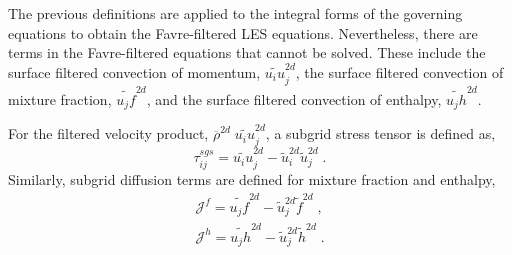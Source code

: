 The previous definitions are applied to the integral forms of the governing equations to obtain the Favre-filtered LES equations.  Nevertheless, there are terms in the Favre-filtered equations that cannot be solved.  These include the surface filtered convection of momentum, $\widetilde{u_i u}^{2d}_j$, the surface filtered convection of mixture fraction, $\widetilde{u_j f}^{2d}$, and the surface filtered convection of enthalpy, $\widetilde{u_j h}^{2d}$.  

For the filtered velocity product, $\overline{\rho}^{2d} \; \widetilde{ u_i u}^{2d}_j$, a subgrid stress tensor is defined as, 
%
\begin{equation}\label{eqn:tau_sgs}
\tau^{sgs}_{ij} = \widetilde{u_i u}^{2d}_j - \widetilde{u}^{2d}_i \widetilde{u}^{2d}_j \; .
\end{equation}
%
Similarly, subgrid diffusion terms are defined for mixture fraction and enthalpy, 
%
\begin{eqnarray}
\mathcal{J}^{f}  = \widetilde{u_j f}^{2d} - \widetilde{u}^{2d}_j \widetilde{f}^{2d} \;, \\
\mathcal{J}^{h} = \widetilde{u_j h}^{2d} - \widetilde{u}^{2d}_j \widetilde{h}^{2d} \; .\\
\end{eqnarray}

